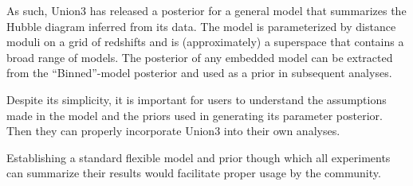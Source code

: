 \documentclass[11pt,a4paper]{article}
\begin{document}
As such, Union3 has released a posterior for a general model that summarizes the Hubble diagram inferred from its data.
The model is parameterized by distance moduli on a grid of redshifts and is (approximately) a superspace that
contains a broad range of models.     The posterior of any embedded model can be
extracted from the  ``Binned''-model posterior and used as a prior in subsequent analyses.

Despite its simplicity, it is important for users to understand the assumptions made in the model and the priors used
in generating its parameter posterior.  Then they can properly incorporate Union3 into their own analyses.

Establishing a standard flexible model and prior though which all experiments can 
summarize their results would facilitate proper usage by the community.



\end{document}
